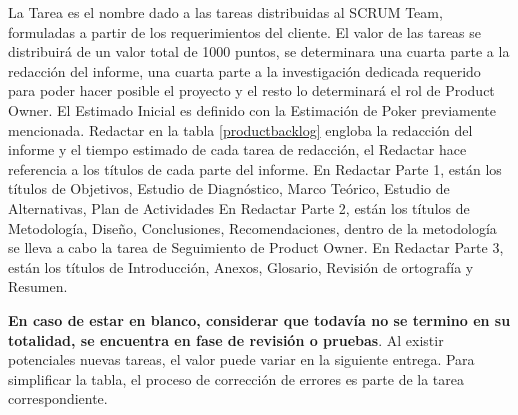 La Tarea es el nombre dado a las tareas distribuidas al SCRUM Team, formuladas a partir de los requerimientos del cliente.
El valor de las tareas se distribuirá de un valor total de 1000 puntos, se determinara una cuarta parte a la redacción del informe, una cuarta parte a la investigación dedicada requerido para poder hacer posible el proyecto y el resto lo determinará el rol de Product Owner.
El Estimado Inicial es definido con la Estimación de Poker previamente mencionada.
Redactar en la tabla \ref{productbacklog} engloba la redacción del informe y el tiempo estimado de cada tarea de redacción, el Redactar hace referencia a los títulos de cada parte del informe.
En Redactar Parte 1, están los títulos de Objetivos, Estudio de Diagnóstico, Marco Teórico, Estudio de Alternativas, Plan de Actividades
En Redactar Parte 2, están los títulos de Metodología, Diseño, Conclusiones, Recomendaciones, dentro de la metodología se lleva a cabo la tarea de Seguimiento de Product Owner.
En Redactar Parte 3, están los títulos de Introducción, Anexos, Glosario, Revisión de ortografía y Resumen.

\textbf{En caso de estar en blanco, considerar que todavía no se termino en su totalidad, se encuentra en fase de revisión o pruebas}. Al existir potenciales nuevas tareas, el valor puede variar en la siguiente entrega. Para simplificar la tabla, el proceso de corrección de errores es parte de la tarea correspondiente.

